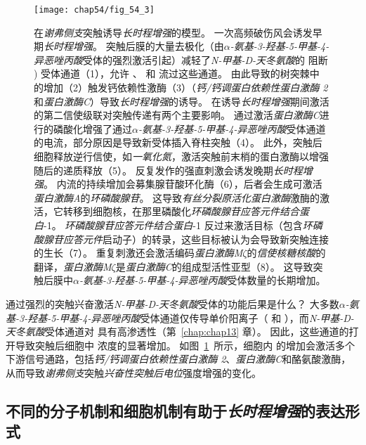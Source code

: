 \begin{figure}[htbp]
	\centering
	\texttt{[image: chap54/fig\_54\_3]}
	\caption{在\textit{谢弗侧支}突触诱导\textit{长时程增强}的模型。
		一次高频破伤风会诱发早期\textit{长时程增强}。
		突触后膜的大量去极化（由\textit{$\alpha$-氨基-3-羟基-5-甲基-4-异恶唑丙酸}受体的强烈激活引起）减轻了\textit{N-甲基-D-天冬氨酸}的  阻断 ) 受体通道（1），允许 、 和  流过这些通道。
		由此导致的树突棘中  的增加（2）触发钙依赖性激酶（3）（\textit{钙/钙调蛋白依赖性蛋白激酶 2}和\textit{蛋白激酶C}）导致\textit{长时程增强}的诱导。
		在诱导\textit{长时程增强}期间激活的第二信使级联对突触传递有两个主要影响。
		通过激活\textit{蛋白激酶C}进行的磷酸化增强了通过\textit{$\alpha$-氨基-3-羟基-5-甲基-4-异恶唑丙酸}受体通道的电流，部分原因是导致新受体插入脊柱突触（4）。
		此外，突触后细胞释放逆行信使，如\textit{一氧化氮}，激活突触前末梢的蛋白激酶以增强随后的递质释放（5）。
		反复发作的强直刺激会诱发晚期\textit{长时程增强}。
		 内流的持续增加会募集腺苷酸环化酶（6），后者会生成可激活\textit{蛋白激酶A}的\textit{环磷酸腺苷}。
		这导致\textit{有丝分裂原活化蛋白激酶}激酶的激活，它转移到细胞核，在那里磷酸化\textit{环磷酸腺苷应答元件结合蛋白}-1。
		\textit{环磷酸腺苷应答元件结合蛋白}-1 反过来激活目标（包含\textit{环磷酸腺苷应答元件}启动子）的转录，这些目标被认为会导致新突触连接的生长（7）。
		重复刺激还会激活编码\textit{蛋白激酶M$\zeta$}的\textit{信使核糖核酸}的翻译，\textit{蛋白激酶M$\zeta$}是\textit{蛋白激酶C}的组成型活性亚型（8）。
		这导致突触后膜中\textit{$\alpha$-氨基-3-羟基-5-甲基-4-异恶唑丙酸}受体数量的长期增加。}
	\label{fig:54_3}
\end{figure}


通过强烈的突触兴奋激活\textit{N-甲基-D-天冬氨酸}受体的功能后果是什么？
大多数\textit{$\alpha$-氨基-3-羟基-5-甲基-4-异恶唑丙酸}受体通道仅传导单价阳离子（ 和 ），而\textit{N-甲基-D-天冬氨酸}受体通道对  具有高渗透性（第~\ref{chap:chap13} 章）。
因此，这些通道的打开导致突触后细胞中  浓度的显著增加。
如图~\ref{fig:54_3}~所示，细胞内  的增加会激活多个下游信号通路，包括\textit{钙/钙调蛋白依赖性蛋白激酶 2}、\textit{蛋白激酶C}和酪氨酸激酶，从而导致\textit{谢弗侧支}突触\textit{兴奋性突触后电位}强度增强的变化。



\subsection{不同的分子机制和细胞机制有助于\textit{长时程增强}的表达形式}

